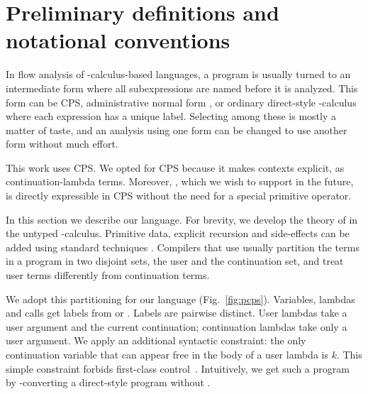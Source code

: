 \documentclass{LMCS}
\theoremstyle{definition} \newtheorem{property}[thm]{Property}
\begin{document}
\section{Preliminary definitions and notational conventions\label{sec:basics}}

\noindent In flow analysis of \lam-calculus-based languages, a program is usually turned
to an intermediate form where all subexpressions are named before it
is analyzed.  This form can be CPS, administrative normal form
\cite{conf/pldi/93/flanagan/anf}, or ordinary direct-style \lam-calculus where 
each expression has a unique label.
Selecting among these is mostly a matter of taste, and an analysis using one
form can be changed to use another form without much effort.

This work uses CPS.
We opted for CPS because it makes contexts explicit, as 
con\-tin\-u\-a\-tion-lambda terms.
Moreover, , which we wish to support in the future, is directly
expressible in CPS without the need for a special primitive operator.

In this section we describe our \cps{} language.
For brevity, we develop the theory of \cfat{} in the untyped \lam-calculus.
Primitive data, explicit recursion and side-effects can be added using standard
techniques \cite[ch.\ 3]{diss/cmu/91/olin} \cite[ch.\ 9]{diss/07/might/dcfa}.
Compilers that use \cps{} \cite{masters/mit/78/steel/rabbit,diss/yale/88/kranz}
usually partition the terms in a program in two disjoint sets, 
the user and the continuation set, 
and treat user terms differently from continuation terms.

We adopt this partitioning for our language (Fig.~\ref{fig:pcps}).
Variables, lambdas and calls get labels from \dulab{} or \dclab.
Labels are pairwise distinct.
User lambdas take a user argument and the current continuation;
continuation lambdas take only a user argument.
We apply an additional syntactic constraint: the only continuation variable
that can appear free in the body of a user lambda \pulam{} is $k$.
This simple constraint forbids first-class 
control~\cite{conf/lfp/92/sabry/cps}.
Intuitively, we get such a program by \cps-converting a direct-style program
without .
\end{document}
